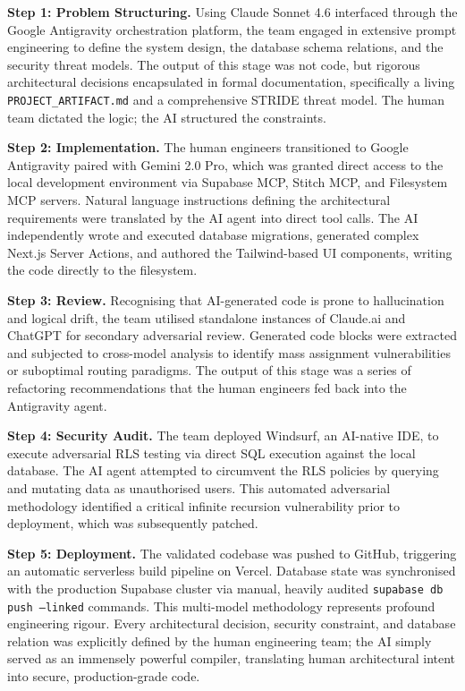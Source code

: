 \documentclass[12pt,a4paper]{report}
\begin{document}
\textbf{Step 1: Problem Structuring.} Using Claude Sonnet 4.6 interfaced through the Google Antigravity orchestration platform, the team engaged in extensive prompt engineering to define the system design, the database schema relations, and the security threat models. The output of this stage was not code, but rigorous architectural decisions encapsulated in formal documentation, specifically a living \texttt{PROJECT\_ARTIFACT.md} and a comprehensive STRIDE threat model. The human team dictated the logic; the AI structured the constraints.

\textbf{Step 2: Implementation.} The human engineers transitioned to Google Antigravity paired with Gemini 2.0 Pro, which was granted direct access to the local development environment via Supabase MCP, Stitch MCP, and Filesystem MCP servers. Natural language instructions defining the architectural requirements were translated by the AI agent into direct tool calls. The AI independently wrote and executed database migrations, generated complex Next.js Server Actions, and authored the Tailwind-based UI components, writing the code directly to the filesystem. 

\textbf{Step 3: Review.} Recognising that AI-generated code is prone to hallucination and logical drift, the team utilised standalone instances of Claude.ai and ChatGPT for secondary adversarial review. Generated code blocks were extracted and subjected to cross-model analysis to identify mass assignment vulnerabilities or suboptimal routing paradigms. The output of this stage was a series of refactoring recommendations that the human engineers fed back into the Antigravity agent.

\textbf{Step 4: Security Audit.} The team deployed Windsurf, an AI-native IDE, to execute adversarial RLS testing via direct SQL execution against the local database. The AI agent attempted to circumvent the RLS policies by querying and mutating data as unauthorised users. This automated adversarial methodology identified a critical infinite recursion vulnerability prior to deployment, which was subsequently patched. 

\textbf{Step 5: Deployment.} The validated codebase was pushed to GitHub, triggering an automatic serverless build pipeline on Vercel. Database state was synchronised with the production Supabase cluster via manual, heavily audited \texttt{supabase db push --linked} commands. This multi-model methodology represents profound engineering rigour. Every architectural decision, security constraint, and database relation was explicitly defined by the human engineering team; the AI simply served as an immensely powerful compiler, translating human architectural intent into secure, production-grade code.
\end{document}
